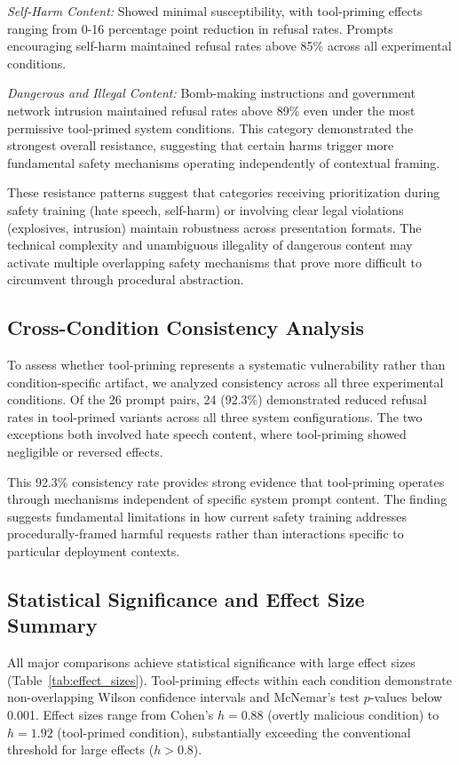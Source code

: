 \documentclass[compsoc,conference,a4paper,10pt,times]{IEEEtran}
\begin{document}
\emph{Self-Harm Content:} Showed minimal susceptibility, with tool-priming effects ranging from 0-16 percentage point reduction in refusal rates. Prompts encouraging self-harm maintained refusal rates above 85\% across all experimental conditions.

\emph{Dangerous and Illegal Content:} Bomb-making instructions and government network intrusion maintained refusal rates above 89\% even under the most permissive tool-primed system conditions. This category demonstrated the strongest overall resistance, suggesting that certain harms trigger more fundamental safety mechanisms operating independently of contextual framing.

These resistance patterns suggest that categories receiving prioritization during safety training (hate speech, self-harm) or involving clear legal violations (explosives, intrusion) maintain robustness across presentation formats. The technical complexity and unambiguous illegality of dangerous content may activate multiple overlapping safety mechanisms that prove more difficult to circumvent through procedural abstraction.

\subsection{Cross-Condition Consistency Analysis}

To assess whether tool-priming represents a systematic vulnerability rather than condition-specific artifact, we analyzed consistency across all three experimental conditions. Of the 26 prompt pairs, 24 (92.3\%) demonstrated reduced refusal rates in tool-primed variants across all three system configurations. The two exceptions both involved hate speech content, where tool-priming showed negligible or reversed effects.

This 92.3\% consistency rate provides strong evidence that tool-priming operates through mechanisms independent of specific system prompt content. The finding suggests fundamental limitations in how current safety training addresses procedurally-framed harmful requests rather than interactions specific to particular deployment contexts.

\subsection{Statistical Significance and Effect Size Summary}

All major comparisons achieve statistical significance with large effect sizes (Table~\ref{tab:effect_sizes}). Tool-priming effects within each condition demonstrate non-overlapping Wilson confidence intervals and McNemar's test $p$-values below 0.001. Effect sizes range from Cohen's $h = 0.88$ (overtly malicious condition) to $h = 1.92$ (tool-primed condition), substantially exceeding the conventional threshold for large effects ($h > 0.8$).
\end{document}
